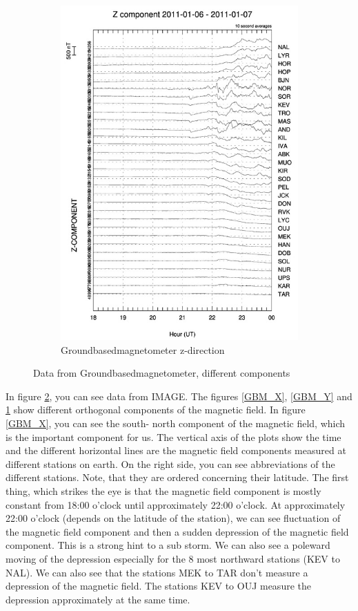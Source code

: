 \documentclass[10pt,a4paper]{article}
\begin{document}
\begin{figure}[h]
\begin{subfigure}{0.3\textwidth}
	\includegraphics[width=\textwidth]{Z_gram.jpg}
	\caption{  Groundbasedmagnetometer z-direction\label{GBM_Z}}
\end{subfigure}
\caption{Data from Groundbasedmagnetometer, different components }
\label{GBM_all in all}
\end{figure}

In figure \ref{GBM_all in all}, you can see data from IMAGE. The figures \ref{GBM_X}, \ref{GBM_Y} and \ref{GBM_Z} show different orthogonal components of the magnetic field. In figure \ref{GBM_X}, you can see the south- north component of the magnetic field, which is the important component for us. The vertical axis of the plots show the time and the different horizontal lines are the magnetic field components measured at different stations on earth. On the right side, you can see abbreviations of the different stations. Note, that they are ordered concerning their latitude. 
The first thing, which strikes the eye is that the magnetic field component is mostly constant from 18:00 o'clock until approximately 22:00 o'clock. At approximately 22:00 o'clock (depends on the latitude of the station), we can see fluctuation of the magnetic field component and then a sudden depression of the magnetic field component. 
This is a strong hint to a sub storm. We can also see a poleward moving of the depression especially for the 8 most northward stations (KEV to NAL). We can also see that the stations MEK to TAR don't measure a depression of the magnetic field. The stations KEV to OUJ measure the depression approximately at the same time. 
\end{document}
